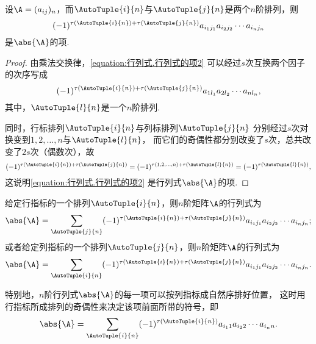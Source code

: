 \begin{lemma}
设\(\A=(a_{ij})_n\)，而\(\AutoTuple{i}{n}\)与\(\AutoTuple{j}{n}\)是两个\(n\)阶排列，则
\begin{equation}\label{equation:行列式.行列式的项2}
	(-1)^{\tau(\AutoTuple{i}{n})+\tau(\AutoTuple{j}{n})}
	a_{i_1j_1} a_{i_2j_2} \dotsm a_{i_nj_n}
\end{equation}
是\(\abs{\A}\)的项.
\begin{proof}
由乘法交换律，\cref{equation:行列式.行列式的项2} 可以经过\(s\)次互换两个因子的次序写成\[
(-1)^{\tau(\AutoTuple{i}{n})+\tau(\AutoTuple{j}{n})}
	a_{1 l_1} a_{2 l_2} \dotsm a_{n l_n},
\]其中，\(\AutoTuple{l}{n}\)是一个\(n\)阶排列.

同时，行标排列\(\AutoTuple{i}{n}\)与列标排列\(\AutoTuple{j}{n}\)
分别经过\(s\)次对换变到\(1,2,\dotsc,n\)与\(\AutoTuple{l}{n}\)，
而它们的奇偶性都分别改变了\(s\)次，总共改变了\(2s\)次（偶数次），故\[
	(-1)^{\tau(\AutoTuple{i}{n})+\tau(\AutoTuple{j}{n})}
	= (-1)^{\tau(1,2,\dotsc,n)+\tau(\AutoTuple{l}{n})}
	= (-1)^{\tau(\AutoTuple{l}{n})},
\]这说明\cref{equation:行列式.行列式的项2} 是行列式\(\abs{\A}\)的项.
\end{proof}
\end{lemma}

\begin{corollary}
给定行指标的一个排列\(\AutoTuple{i}{n}\)，则\(n\)阶矩阵\(\A\)的行列式为
\begin{equation}\label{equation:行列式.给定行指标排列下的行列式的完全展开式}
\abs{\A}
= \sum_{\AutoTuple{j}{n}}
(-1)^{\tau(\AutoTuple{i}{n})+\tau(\AutoTuple{j}{n})}
a_{i_1 j_1} a_{i_2 j_2} \dotsm a_{i_n j_n};
\end{equation}
或者给定列指标的一个排列\(\AutoTuple{j}{n}\)，则\(n\)阶矩阵\(\A\)的行列式为
\begin{equation}\label{equation:行列式.给定列指标排列下的行列式的完全展开式}
	\abs{\A}
	= \sum_{\AutoTuple{i}{n}}
	(-1)^{\tau(\AutoTuple{i}{n})+\tau(\AutoTuple{j}{n})}
	a_{i_1 j_1} a_{i_2 j_2} \dotsm a_{i_n j_n}.
\end{equation}

特别地，\(n\)阶行列式\(\abs{\A}\)的每一项可以按列指标成自然序排好位置，
这时用行指标所成排列的奇偶性来决定该项前面所带的符号，即
\begin{equation}\label{equation:行列式.给定列指标为自然序下行列式的完全展开式}
	\abs{\A} =
	\sum_{\AutoTuple{i}{n}}
	(-1)^{\tau(\AutoTuple{i}{n})}
	a_{i_1 1} a_{i_2 2} \dotsm a_{i_n n}.
\end{equation}
\end{corollary}

